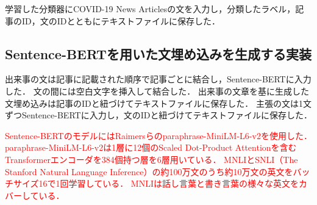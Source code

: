 \documentclass[12pt,a4j]{jreport}
\begin{document}

学習した分類器にCOVID-19 News Articlesの文を入力し，分類したラベル，記事のID，文のIDとともにテキストファイルに保存した．

\subsection{Sentence-BERTを用いた文埋め込みを生成する実装}
出来事の文は記事に記載された順序で記事ごとに結合し，Sentence-BERTに入力した．
文の間には空白文字を挿入して結合した．
出来事の文章を基に生成した文埋め込みは記事のIDと紐づけてテキストファイルに保存した．
主張の文は1文ずつSentence-BERTに入力し，文のIDと紐づけてテキストファイルに保存した．


\textcolor{red}{
Sentence-BERTのモデルにはRaimersらのparaphrase-MiniLM-L6-v2を使用した\cite{reimers_sentence-bert_2019}．
paraphrase-MiniLM-L6-v2は1層に12個のScaled Dot-Product Attentionを含むTransformerエンコーダを384個持つ層を6層用いている．
MNLIとSNLI（The Stanford Natural Language Inference）の約100万文のうち約10万文の英文をバッチサイズ16で1回学習している．
MNLIは話し言葉と書き言葉の様々な英文をカバーしている．
}


\end{document}
